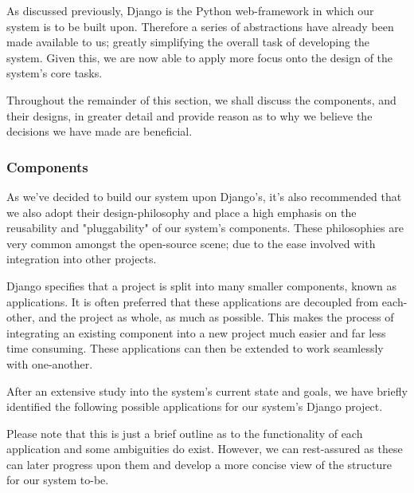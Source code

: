 		As discussed previously, Django is the Python web-framework in which our system is to be built upon. Therefore a series of abstractions have already been made available to us; greatly simplifying the overall task of developing the system. Given this, we are now able to apply more focus onto the design of the system's core tasks.
		
		Throughout the remainder of this section, we shall discuss the components, and their designs, in greater detail and provide reason as to why we believe the decisions we have made are beneficial.
	
	\subsubsection{Components}
		As we've decided to build our system upon Django's, it's also recommended that we also adopt their design-philosophy and place a high emphasis on the reusability and "pluggability" of our system's components. These philosophies are very common amongst the open-source scene; due to the ease involved with integration into other projects.
		
		Django specifies that a project is split into many smaller components, known as applications. It is often preferred that these applications are decoupled from each-other, and the project as whole, as much as possible. This makes the process of integrating an existing component into a new project much easier and far less time consuming. These applications can then be extended to work seamlessly with one-another.
		
		After an extensive study into the system's current state and goals, we have briefly identified the following possible applications for our system's Django project.
		
		Please note that this is just a brief outline as to the functionality of each application and some ambiguities do exist. However, we can rest-assured as these can later progress upon them and develop a more concise view of the structure for our system to-be.
		

